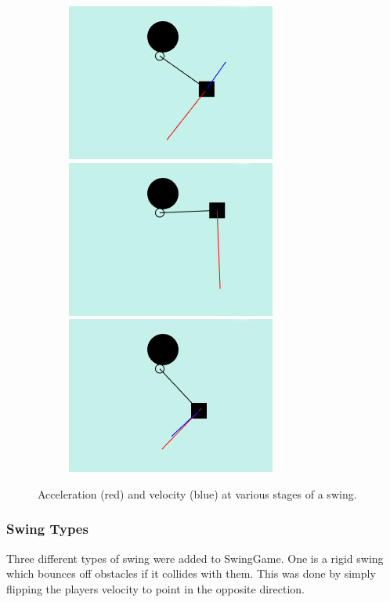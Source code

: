 \documentclass[]{report}
\begin{document}
\begin{figure}[H]
				\begin{subfigure}[b]{1\textwidth}
		        \includegraphics[scale=0.4]{swingingMotionRightLowerUp}
		        \includegraphics[scale=0.4]{swingingMotionRightTop}
		        \includegraphics[scale=0.4]{swingingMotionRightLowerDown}
  		        \end{subfigure}
				\caption{Acceleration (red) and velocity (blue) at various stages of a swing.}
				\label{swingingMotion}
			\end{figure}
			
			\subsubsection{Swing Types}
			Three different types of swing were added to SwingGame. One is a rigid swing which bounces off obstacles if it collides with them. This was done by simply flipping the players velocity to point in the opposite direction.
			
\end{document}
